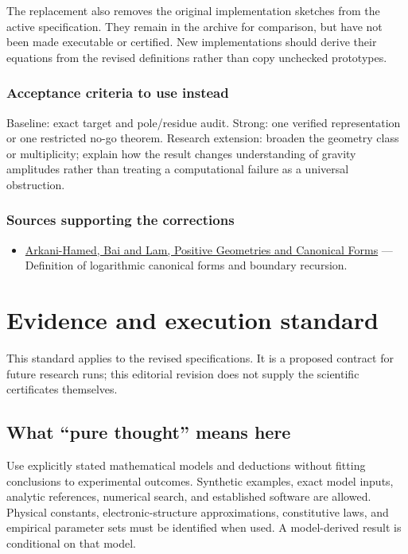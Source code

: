 \documentclass[
  11pt,
]{article}
\providecommand{\tightlist}{%
  \setlength{\itemsep}{0pt}\setlength{\parskip}{0pt}}
\begin{document}
The replacement also removes the original implementation sketches from
the active specification. They remain in the archive for comparison, but
have not been made executable or certified. New implementations should
derive their equations from the revised definitions rather than copy
unchecked prototypes.

\subsubsection{Acceptance criteria to use instead}

Baseline: exact target and pole/residue audit. Strong: one verified
representation or one restricted no-go theorem. Research extension:
broaden the geometry class or multiplicity; explain how the result
changes understanding of gravity amplitudes rather than treating a
computational failure as a universal obstruction.

\subsubsection{Sources supporting the corrections}

\begin{itemize}
\tightlist
\item
  \href{https://arxiv.org/abs/1703.04541}{Arkani-Hamed, Bai and Lam,
  Positive Geometries and Canonical Forms} --- Definition of logarithmic
  canonical forms and boundary recursion.
\end{itemize}

\section{Evidence and execution standard}

This standard applies to the revised specifications. It is a proposed
contract for future research runs; this editorial revision does not
supply the scientific certificates themselves.

\subsection{What ``pure thought'' means here}

Use explicitly stated mathematical models and deductions without fitting
conclusions to experimental outcomes. Synthetic examples, exact model
inputs, analytic references, numerical search, and established software
are allowed. Physical constants, electronic-structure approximations,
constitutive laws, and empirical parameter sets must be identified when
used. A model-derived result is conditional on that model.
\end{document}
